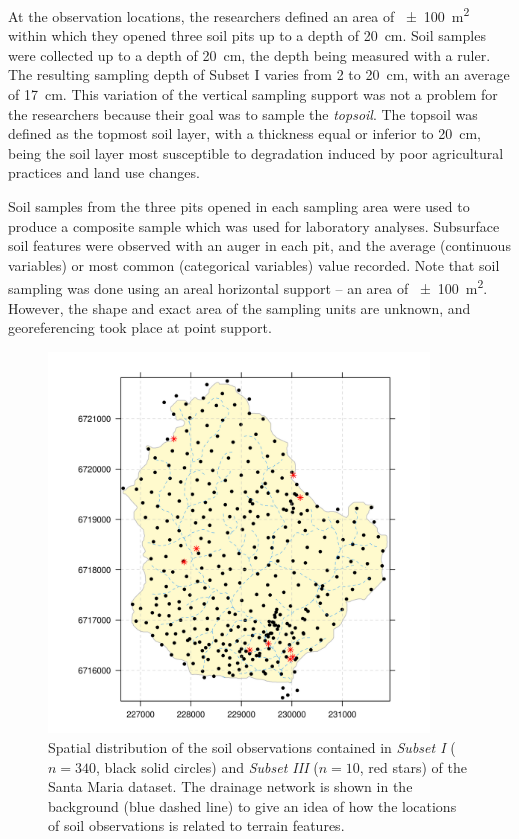 At the observation locations, the researchers defined an area of \SI{\pm100}{\metre\squared} within which they 
opened three soil pits up to a depth of \SI{20}{\centi\metre}. Soil samples were collected up to a depth of 
\SI{20}{\centi\metre}, the depth being measured with a ruler. The resulting sampling depth of Subset I varies 
from \num{2} to \SI{20}{\centi\metre}, with an average of \SI{17}{\centi\metre}. This variation of the 
vertical sampling support\footsupport{} was not a problem for the researchers because their goal was to sample 
the \emph{topsoil}. The topsoil was defined as the topmost soil layer, with a thickness equal or inferior to 
\SI{20}{\centi\metre}, being the soil layer most susceptible to degradation induced by poor agricultural 
practices and land use changes.

Soil samples from the three pits opened in each sampling area were used to produce a composite sample which 
was used for laboratory analyses. Subsurface soil features were observed with an auger in each pit, and the 
average (continuous variables) or most common (categorical variables) value recorded. Note that soil sampling 
was done using an areal horizontal support -- an area of \SI{\pm100}{\metre\squared}. However, the shape and 
exact area of the sampling units are unknown, and georeferencing took place at point support.

\begin{figure}[!ht]
\centering
\includegraphics[width=0.90\textwidth]{fig/chap04-subsets-I-III}
\caption[Spatial distribution of \emph{Subset I} and \emph{Subset III}.]{Spatial distribution of the soil 
observations contained in \emph{Subset I} ($n = 340$, black solid circles) and \emph{Subset III} ($n = 
10$, red stars) of the Santa Maria dataset. The drainage network is shown in the background (blue 
dashed line) to give an idea of how the locations of soil observations is related to terrain features.}
\label{fig:chap04-subsets-I-III}
\end{figure}

